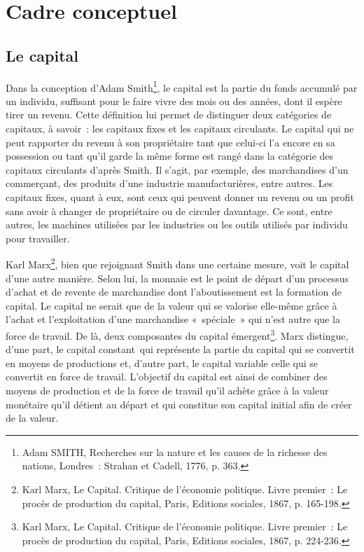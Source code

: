 \documentclass[12pt,a4paper,oneside]{report}
\begin{document}
\section{Cadre conceptuel}

\subsection{Le capital}

Dans la conception d’Adam Smith\footnote{Adam SMITH, Recherches sur la nature et les causes de la richesse des
nations, Londres~: Strahan et Cadell, 1776, p. 363.}, le capital est la partie du fonds accumulé par un
individu, suffisant pour le faire vivre des mois ou des années, dont il espère tirer un revenu. Cette
définition lui permet de distinguer deux catégories de capitaux, à savoir~: les capitaux fixes et les capitaux
circulants. Le capital qui ne peut rapporter du revenu à son propriétaire tant que celui-ci l’a encore en sa
possession ou tant qu’il garde la même forme est rangé dans la catégorie des capitaux circulants d’après
Smith. Il s’agit, par exemple, des marchandises d’un commerçant, des produits d’une industrie manufacturières,
entre autres. Les capitaux fixes, quant à eux, sont ceux qui peuvent donner un revenu ou un profit sans avoir
à changer de propriétaire ou de circuler davantage. Ce sont, entre autres, les machines utilisées par les
industries ou les outils utilisés par individu pour travailler.

Karl Marx\footnote{Karl Marx, Le Capital. Critique de l’économie politique. Livre premier~: Le procès de
production du capital, Paris, Editions sociales, 1867, p. 165-198.}, bien que rejoignant Smith dans une
certaine mesure, voit le capital d’une autre manière. Selon lui, la monnaie est le point de départ d’un
processus d’achat et de revente de marchandise dont l’aboutissement est la formation de capital. Le capital ne
serait que de la valeur qui se valorise elle-même grâce à l’achat et l’exploitation d’une marchandise
«~spéciale~» qui n’est autre que la force de travail. De là, deux composantes du capital
émergent\footnote{Karl Marx, Le Capital. Critique de l’économie politique. Livre premier~: Le procès de
production du capital, Paris, Editions sociales, 1867, p. 224-236.}. Marx distingue, d’une part, le capital
constant~qui représente la partie du capital qui se convertit en moyens de productions et, d’autre part, le
capital variable celle qui se convertit en force de travail. L’objectif du capital est ainsi de combiner des
moyens de production et de la force de travail qu’il achète grâce à la valeur monétaire qu’il détient au
départ et qui constitue son capital initial afin de créer de la valeur.
\end{document}
